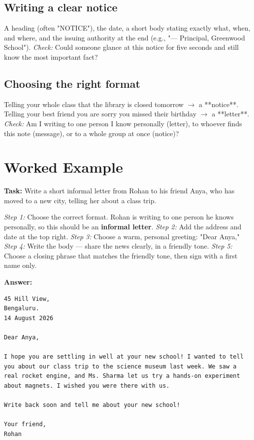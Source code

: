 \subsection*{Writing a clear notice}
A heading (often "NOTICE"), the date, a short body stating exactly what, when, and where, and the issuing authority at the end (e.g., "— Principal, Greenwood School"). \textit{Check:} Could someone glance at this notice for five seconds and still know the most important fact?

\subsection*{Choosing the right format}
Telling your whole class that the library is closed tomorrow $\rightarrow$ a **notice**. Telling your best friend you are sorry you missed their birthday $\rightarrow$ a **letter**. \textit{Check:} Am I writing to one person I know personally (letter), to whoever finds this note (message), or to a whole group at once (notice)?

\section{Worked Example}
\begin{examplebox}
\textbf{Task:} Write a short informal letter from Rohan to his friend Anya, who has moved to a new city, telling her about a class trip.

\textit{Step 1:} Choose the correct format. Rohan is writing to one person he knows personally, so this should be an \textbf{informal letter}.
\textit{Step 2:} Add the address and date at the top right.
\textit{Step 3:} Choose a warm, personal greeting: "Dear Anya,"
\textit{Step 4:} Write the body — share the news clearly, in a friendly tone.
\textit{Step 5:} Choose a closing phrase that matches the friendly tone, then sign with a first name only.

\textbf{Answer:}
\begin{verbatim}
45 Hill View,
Bengaluru.
14 August 2026

Dear Anya,

I hope you are settling in well at your new school! I wanted to tell you about our class trip to the science museum last week. We saw a real rocket engine, and Ms. Sharma let us try a hands-on experiment about magnets. I wished you were there with us.

Write back soon and tell me about your new school!

Your friend,
Rohan
\end{verbatim}
\end{examplebox}

